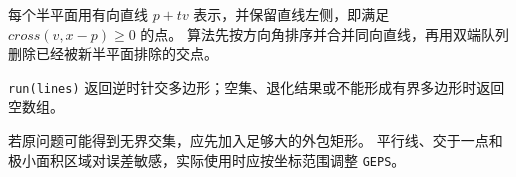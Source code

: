 每个半平面用有向直线 \(p+t v\) 表示，并保留直线左侧，即满足 \(cross(v,x-p)\ge0\) 的点。
算法先按方向角排序并合并同向直线，再用双端队列删除已经被新半平面排除的交点。

\texttt{run(lines)} 返回逆时针交多边形；空集、退化结果或不能形成有界多边形时返回空数组。

\begin{icpcwarning}[有界性与误差]
  若原问题可能得到无界交集，应先加入足够大的外包矩形。
  平行线、交于一点和极小面积区域对误差敏感，实际使用时应按坐标范围调整 \texttt{GEPS}。
\end{icpcwarning}
